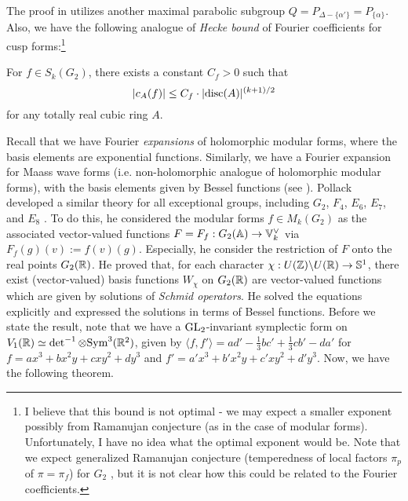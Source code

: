 The proof in \cite{gan2002fourier} utilizes another maximal parabolic subgroup $Q = P_{\Delta - \{\alpha'\}} = P_{\{\alpha\}}$.
Also, we have the following analogue of \emph{Hecke bound} of Fourier coefficients for cusp forms:\footnote{I believe that this bound is not optimal - we may expect a smaller exponent possibly from Ramanujan conjecture (as in the case of modular forms).
Unfortunately, I have no idea what the optimal exponent would be.
Note that we expect generalized Ramanujan conjecture (temperedness of local factors $\pi_p$ of $\pi = \pi_f$) for $G_2$ \cite{sarnak2005notes}, but it is not clear how this could be related to the Fourier coefficients.}
\begin{proposition}
\label{prop:g2heckebound}
    For $f \in S_k(G_2)$, there exists a constant $C_f > 0$ such that
    $$
        |c_A(f)| \le C_f \cdot |\mathrm{disc}(A)|^{(k+1)/2}
    $$
    for any totally real cubic ring $A$.
\end{proposition}

Recall that we have Fourier \emph{expansions} of holomorphic modular forms, where the basis elements are exponential functions.
Similarly, we have a Fourier expansion for Maass wave forms (i.e. non-holomorphic analogue of holomorphic modular forms), with the basis elements given by Bessel functions (see \cite[Section 1.9]{bump1998automorphic}).
Pollack developed a similar theory for all exceptional groups, including $G_2$, $F_4$, $E_6$, $E_7$, and $E_8$ \cite{pollack2020fourier}.
To do this, he considered the modular forms $f \in M_k(G_2)$ as the associated vector-valued functions $F = F_f : G_2(\mathbb{A}) \to \mathbb{V}_k^\vee$ via $F_f(g)(v) := f(v)(g)$.
Especially, he consider the restriction of $F$ onto the real points $G_2(\mathbb{R})$.
He proved that, for each character $\chi: U(\mathbb{Z}) \backslash U(\mathbb{R}) \to \mathbb{S}^1$, there exist (vector-valued) basis functions $W_\chi$ on $G_2(\mathbb{R})$ are vector-valued functions which are given by solutions of \emph{Schmid operators}.
He solved the equations explicitly and expressed the solutions in terms of Bessel functions.
Before we state the result, note that we have a $\mathrm{GL}_2$-invariant symplectic form on $V_1(\mathbb{R}) \simeq \det^{-1} \otimes \mathrm{Sym}^{3}(\mathbb{R}^2)$, given by
$
\langle f, f' \rangle = ad' - \frac{1}{3} bc' + \frac{1}{3} cb' - da'
$
for $f = ax^3 + bx^2 y + cxy^2 + dy^3$ and $f' = a'x^3 + b'x^2 y + c' xy^2 + d'y^3$.
Now, we have the following theorem.

